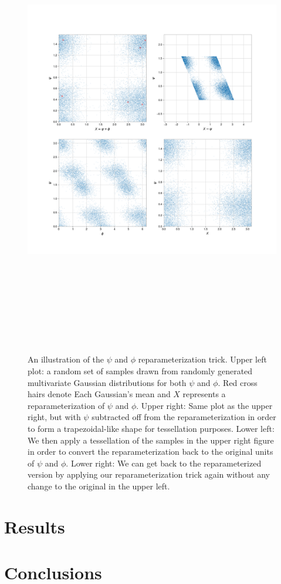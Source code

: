 \begin{figure}
    \centering
    \includegraphics[width=16cm,height=20cm,keepaspectratio]{figures/Xpsi.png}
    \caption[An illustration of the $\psi$ and $\phi$ reparameterization trick.]{An illustration of the $\psi$ and $\phi$ reparameterization trick. Upper left 
    plot: a random set of samples drawn from randomly generated multivariate Gaussian distributions for both $\psi$ and $\phi$. Red cross hairs denote Each Gaussian's mean and $X$ represents a reparameterization of $\psi$ and $\phi$. Upper right: Same plot as the upper right, but with $\psi$ subtracted off from the reparameterization in 
    order to form a trapezoidal-like shape for tessellation purposes. Lower left: We then apply a tessellation of the samples in the upper right figure in order to convert the reparameterization back to the original units of $\psi$ and $\phi$. Lower right: We can get back to the reparameterized version by applying our reparameterization trick again without any change to the original in the upper left.}
    \label{fig:Xpsi}
\end{figure}



\section{Results}

\section{Conclusions}

